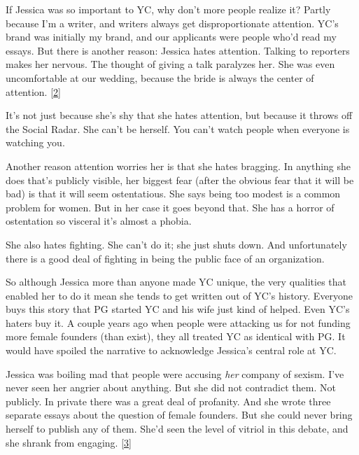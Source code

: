If
                  Jessica was so important to YC, why don't more people realize
                  it? Partly because I'm a writer, and writers always get
                  disproportionate attention. YC's brand was initially my brand,
                  and our applicants were people who'd read my essays. But there
                  is another reason: Jessica hates attention. Talking to
                  reporters makes her nervous. The thought of giving a talk
                  paralyzes her. She was even uncomfortable at our wedding,
                  because the bride is always the center of attention.
                  [\href{\#f2n}{2}]

It's not just because she's shy that she hates
                  attention, but because it throws off the Social Radar. She
                  can't be herself. You can't watch people when everyone is
                  watching you.

Another reason attention worries her
                  is that she hates bragging. In anything she does that's
                  publicly visible, her biggest fear (after the obvious fear
                  that it will be bad) is that it will seem ostentatious. She
                  says being too modest is a common problem for women. But in
                  her case it goes beyond that. She has a horror of ostentation
                  so visceral it's almost a phobia.

She also hates
                  fighting. She can't do it; she just shuts down. And
                  unfortunately there is a good deal of fighting in being the
                  public face of an organization.

So although Jessica
                  more than anyone made YC unique, the very qualities that
                  enabled her to do it mean she tends to get written out of YC's
                  history. Everyone buys this story that PG started YC and his
                  wife just kind of helped. Even YC's haters buy it. A couple
                  years ago when people were attacking us for not funding more
                  female founders (than exist), they all treated YC as identical
                  with PG. It would have spoiled the narrative to acknowledge
                  Jessica's central role at YC.

Jessica was boiling
                  mad that people were accusing \emph{her} company of sexism.
                  I've never seen her angrier about anything. But she did not
                  contradict them. Not publicly. In private there was a great
                  deal of profanity. And she wrote three separate essays about
                  the question of female founders. But she could never bring
                  herself to publish any of them. She'd seen the level of
                  vitriol in this debate, and she shrank from engaging.
                  [\href{\#f3n}{3}]

